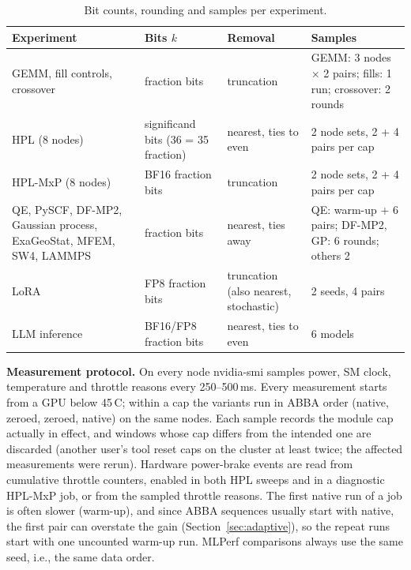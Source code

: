 \documentclass[conference]{IEEEtran}
\begin{document}
\begin{table}[t]
\caption{Bit counts, rounding and samples per experiment.}\label{tab:settings}
\centering\footnotesize\setlength{\tabcolsep}{2.5pt}
\begin{tabular}{@{}p{}p{}p{}p{}@{}}
\toprule
Experiment & Bits $k$ & Removal & Samples \\
\midrule
GEMM, fill controls, crossover & fraction bits & truncation & GEMM: 3 nodes $\times$ 2 pairs; fills: 1 run; crossover: 2 rounds \\
HPL (8 nodes) & significand bits (36 = 35 fraction) & nearest, ties to even & 2 node sets, 2 + 4 pairs per cap \\
HPL-MxP (8 nodes) & BF16 fraction bits & truncation & 2 node sets, 2 + 4 pairs per cap \\
QE, PySCF, DF-MP2, Gaussian process, ExaGeoStat, MFEM, SW4, LAMMPS & fraction bits & nearest, ties away & QE: warm-up + 6 pairs; DF-MP2, GP: 6 rounds; others 2 \\
LoRA & FP8 fraction bits & truncation (also nearest, stochastic) & 2 seeds, 4 pairs \\
LLM inference & BF16/FP8 fraction bits & nearest, ties to even & 6 models \\
\bottomrule
\end{tabular}
\end{table}

\textbf{Measurement protocol.} On every node nvidia-smi samples power, SM clock, temperature and throttle reasons
every 250--500\,ms. Every measurement starts from a GPU below 45\,\textdegree C; within a cap the variants run in
ABBA order (native, zeroed, zeroed, native) on the same nodes. Each sample records the module cap actually in
effect, and windows whose cap differs from the intended one are discarded (another user's tool reset caps on the
cluster at least twice; the affected measurements were rerun). Hardware power-brake events are read from cumulative
throttle counters, enabled in both HPL sweeps and in a diagnostic HPL-MxP job, or from the sampled throttle reasons. The first native run of a job is
often slower (warm-up), and since ABBA sequences usually start with native, the first pair can overstate the gain
(Section~\ref{sec:adaptive}), so the repeat runs start with one uncounted warm-up run. MLPerf comparisons always use the same seed, i.e., the same data
order.
\end{document}
